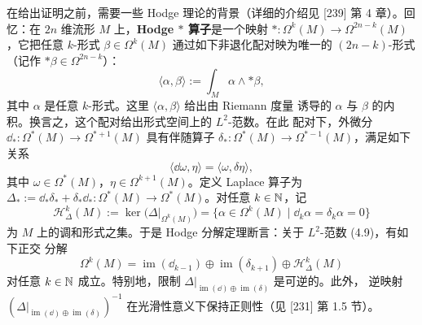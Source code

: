在给出证明之前，需要一些 Hodge 理论的背景（详细的介绍见 [239] 第 4 章）。回忆：在
$2n$ 维流形 $M$ 上，\textbf{Hodge $\ast$ 算子}是一个映射
$\ast\colon\Omega^k(M)\to\Omega^{2n-k}(M)$，它把任意 $k$-形式
$\beta\in\Omega^k(M)$ 通过如下非退化配对映为唯一的 $(2n-k)$-形式（记作
$\ast\beta\in\Omega^{2n-k}$）：
\begin{equation}\tag{4.9}
  \langle\alpha,\beta\rangle:=\int_M\alpha\wedge\ast\beta,
\end{equation}
其中 $\alpha$ 是任意 $k$-形式。这里 $\langle\alpha,\beta\rangle$ 给出由 Riemann 度量
诱导的 $\alpha$ 与 $\beta$ 的内积。换言之，这个配对给出形式空间上的 $L^2$-范数。在此
配对下，外微分 $\dd_*\colon\Omega^*(M)\to\Omega^{*+1}(M)$ 具有伴随算子
$\delta_*\colon\Omega^*(M)\to\Omega^{*-1}(M)$，满足如下关系
\begin{equation*}
  \langle\dd\omega,\eta\rangle=\langle\omega,\delta\eta\rangle,
\end{equation*}
其中 $\omega\in\Omega^*(M)$，$\eta\in\Omega^{k+1}(M)$。定义 Laplace 算子为
$\Delta_*:=\dd_*\delta_*+\delta_*\dd_*\colon\Omega^*(M)\to\Omega^*(M)$。对任意
$k\in\mathbb{N}$，记
\begin{equation}\tag{4.10}
  \mathcal H_\Delta^k(M):=\ker\bigl(\Delta|_{\Omega^k(M)}\bigr)
  =\{\alpha\in\Omega^k(M)\mid \dd_k\alpha=\delta_k\alpha=0\}
\end{equation}
为 $M$ 上的调和形式之集。于是 Hodge 分解定理断言：关于 $L^2$-范数 (4.9)，有如下正交
分解
\begin{equation}\tag{4.11}
  \Omega^k(M)=\operatorname{im}(\dd_{k-1})\oplus\operatorname{im}(\delta_{k+1})
  \oplus\mathcal H_\Delta^k(M)
\end{equation}
对任意 $k\in\mathbb{N}$ 成立。特别地，限制
$\Delta|_{\operatorname{im}(\dd)\oplus\operatorname{im}(\delta)}$ 是可逆的。此外，
逆映射
$(\Delta|_{\operatorname{im}(\dd)\oplus\operatorname{im}(\delta)})^{-1}$
在光滑性意义下保持正则性（见 [231] 第 1.5 节）。

